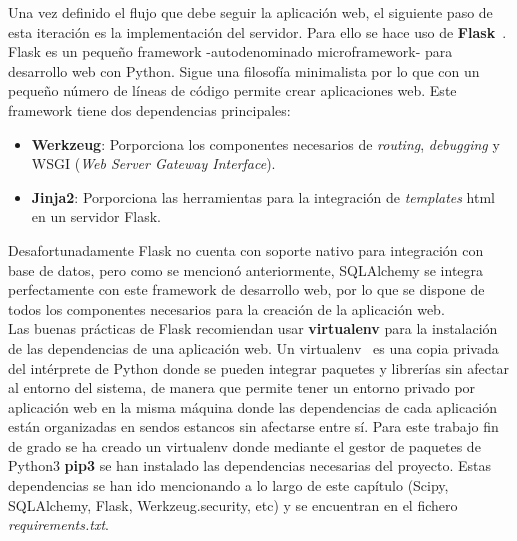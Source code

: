 Una vez definido el flujo que debe seguir la aplicación web, el siguiente paso de esta iteración es la implementación del servidor. Para ello se hace uso de \textbf{Flask}~\cite{Grinb14}. Flask es un pequeño framework -autodenominado microframework- para desarrollo web con Python. Sigue una filosofía minimalista por lo que con un pequeño número de líneas de código permite crear aplicaciones web. Este framework tiene dos dependencias principales:
\begin{itemize}
\item \textbf{Werkzeug}: Porporciona los componentes necesarios de \textit{routing}, \textit{debugging} y WSGI (\textit{Web Server Gateway Interface}).
\item \textbf{Jinja2}: Porporciona las herramientas para la integración de \textit{templates} html en un servidor Flask.
\end{itemize}
Desafortunadamente Flask no cuenta con soporte nativo para integración con base de datos, pero como se mencionó anteriormente, SQLAlchemy se integra perfectamente con este framework de desarrollo web, por lo que se dispone de todos los componentes necesarios para la creación de la aplicación web.\\
Las buenas prácticas de Flask recomiendan usar \textbf{virtualenv} para la instalación de las dependencias de una aplicación web. Un virtualenv~\cite{VirPy} es una copia privada del intérprete de Python donde se pueden integrar paquetes y librerías sin afectar al entorno del sistema, de manera que permite tener un entorno privado por aplicación web en la misma máquina donde las dependencias de cada aplicación están organizadas en sendos estancos sin afectarse entre sí. Para este trabajo fin de grado se ha creado un virtualenv donde mediante el gestor de paquetes de Python3 \textbf{pip3} se han instalado las dependencias necesarias del proyecto. Estas dependencias se han ido mencionando a lo largo de este capítulo (Scipy, SQLAlchemy, Flask, Werkzeug.security, etc) y se encuentran en el fichero \textit{requirements.txt}.\\

